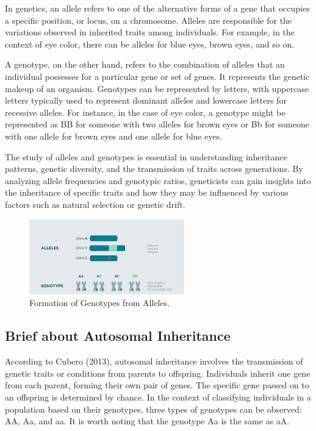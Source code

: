 \documentclass[a4paper,12pt]{article}
\begin{document}
In genetics, an allele refers to one of the alternative forms of a gene that occupies a specific position, or locus, on a chromosome. Alleles are responsible for the variations observed in inherited traits among individuals. For example, in the context of eye color, there can be alleles for blue eyes, brown eyes, and so on.

A genotype, on the other hand, refers to the combination of alleles that an individual possesses for a particular gene or set of genes. It represents the genetic makeup of an organism. Genotypes can be represented by letters, with uppercase letters typically used to represent dominant alleles and lowercase letters for recessive alleles. For instance, in the case of eye color, a genotype might be represented as BB for someone with two alleles for brown eyes or Bb for someone with one allele for brown eyes and one allele for blue eyes.

The study of alleles and genotypes is essential in understanding inheritance patterns, genetic diversity, and the transmission of traits across generations. By analyzing allele frequencies and genotypic ratios, geneticists can gain insights into the inheritance of specific traits and how they may be influenced by various factors such as natural selection or genetic drift. \ \\
\begin{figure}[h]
\centering
\includegraphics[width=0.6\textwidth]{image1.png}
\caption{Formation of Genotypes from Alleles.}
\label{fig:Punett-table}
\end{figure}
\subsection{Brief about Autosomal Inheritance}
According to Cubero (2013), autosomal inheritance involves the transmission of genetic traits or conditions from parents to offspring. Individuals inherit one gene from each parent, forming their own pair of genes. The specific gene passed on to an offspring is determined by chance. In the context of classifying individuals in a population based on their genotypes, three types of genotypes can be observed: AA, Aa, and aa. It is worth noting that the genotype Aa is the same as aA.
\end{document}
